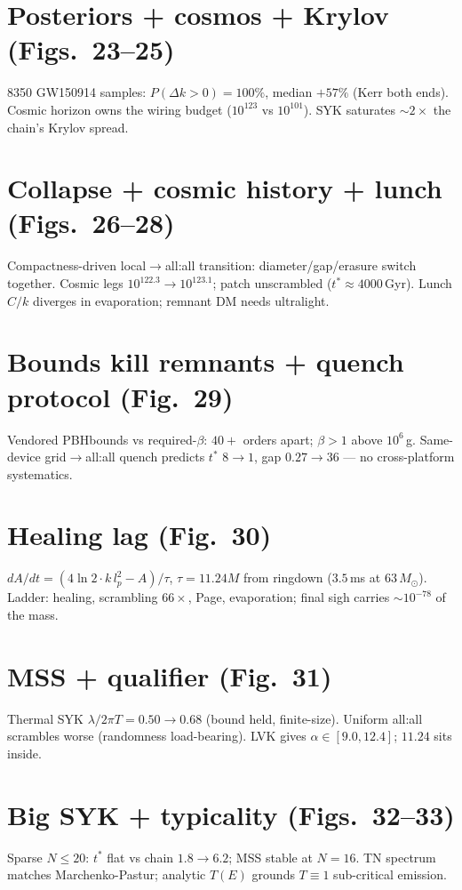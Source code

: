 \documentclass[11pt]{article}
\begin{document}
\section{Posteriors + cosmos + Krylov (Figs.~23--25)}
8350 GW150914 samples: $P(\Delta k>0)=100\%$, median $+57\%$ (Kerr both
ends). Cosmic horizon owns the wiring budget ($10^{123}$ vs $10^{101}$).
SYK saturates $\sim2\times$ the chain's Krylov spread.

\section{Collapse + cosmic history + lunch (Figs.~26--28)}
Compactness-driven local$\to$all:all transition: diameter/gap/erasure switch
together. Cosmic legs $10^{122.3}\to10^{123.1}$; patch unscrambled ($t^*\approx
4000$\,Gyr). Lunch $C/k$ diverges in evaporation; remnant DM needs ultralight.

\section{Bounds kill remnants + quench protocol (Fig.~29)}
Vendored PBHbounds vs required-$\beta$: $40+$ orders apart; $\beta>1$ above
$10^6$\,g. Same-device grid$\to$all:all quench predicts $t^*$ $8\to1$,
gap $0.27\to36$ — no cross-platform systematics.

\section{Healing lag (Fig.~30)}
$dA/dt=(4\ln2\cdot k\,l_p^2-A)/\tau$, $\tau=11.24M$ from ringdown ($3.5$\,ms at
$63\,M_\odot$). Ladder: healing, scrambling $66\times$, Page, evaporation;
final sigh carries $\sim10^{-78}$ of the mass.

\section{MSS + qualifier (Fig.~31)}
Thermal SYK $\lambda/2\pi T=0.50\to0.68$ (bound held, finite-size).
Uniform all:all scrambles worse (randomness load-bearing).
LVK gives $\alpha\in[9.0,12.4]$; $11.24$ sits inside.

\section{Big SYK + typicality (Figs.~32--33)}
Sparse $N\le20$: $t^*$ flat vs chain $1.8\to6.2$; MSS stable at $N=16$.
TN spectrum matches Marchenko-Pastur; analytic $T(E)$ grounds $T\equiv1$
sub-critical emission.
\end{document}
